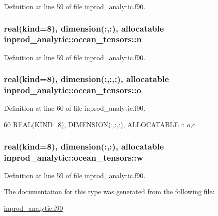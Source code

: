 Definition at line 59 of file inprod\+\_\+analytic.\+f90.

\subsubsection[{\texorpdfstring{n}{n}}]{\setlength{\rightskip}{0pt plus 5cm}real(kind=8), dimension(\+:,\+:), allocatable inprod\+\_\+analytic\+::ocean\+\_\+tensors\+::n\hspace{0.3cm}{\ttfamily [private]}}\hypertarget{structinprod__analytic_1_1ocean__tensors_a5087e225a596aee2d668f6282dd6a019}{}\label{structinprod__analytic_1_1ocean__tensors_a5087e225a596aee2d668f6282dd6a019}


Definition at line 59 of file inprod\+\_\+analytic.\+f90.

\subsubsection[{\texorpdfstring{o}{o}}]{\setlength{\rightskip}{0pt plus 5cm}real(kind=8), dimension(\+:,\+:,\+:), allocatable inprod\+\_\+analytic\+::ocean\+\_\+tensors\+::o\hspace{0.3cm}{\ttfamily [private]}}\hypertarget{structinprod__analytic_1_1ocean__tensors_abab4899297820e7a92cc8d363a91ed13}{}\label{structinprod__analytic_1_1ocean__tensors_abab4899297820e7a92cc8d363a91ed13}


Definition at line 60 of file inprod\+\_\+analytic.\+f90.


\begin{DoxyCode}
60      \textcolor{keywordtype}{REAL(KIND=8)}, \textcolor{keywordtype}{DIMENSION(:,:,:)}, \textcolor{keywordtype}{ALLOCATABLE} :: o,c
\end{DoxyCode}
\subsubsection[{\texorpdfstring{w}{w}}]{\setlength{\rightskip}{0pt plus 5cm}real(kind=8), dimension(\+:,\+:), allocatable inprod\+\_\+analytic\+::ocean\+\_\+tensors\+::w\hspace{0.3cm}{\ttfamily [private]}}\hypertarget{structinprod__analytic_1_1ocean__tensors_ae4875d9d3ea854b3b7b57e0c07a07ede}{}\label{structinprod__analytic_1_1ocean__tensors_ae4875d9d3ea854b3b7b57e0c07a07ede}


Definition at line 59 of file inprod\+\_\+analytic.\+f90.



The documentation for this type was generated from the following file\+:\begin{DoxyCompactItemize}
\item 
\hyperlink{inprod__analytic_8f90}{inprod\+\_\+analytic.\+f90}\end{DoxyCompactItemize}
